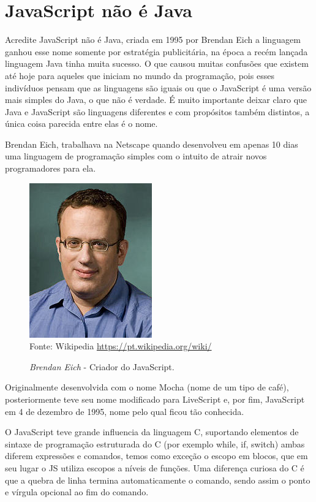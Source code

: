 \documentclass[
	12pt,				%
	openright,			%
	twoside,			%
	a4paper,			%
	english,			%
	brazil				%
	]{abntex2}
\begin{document}
\chapter{JavaScript não é Java}
Acredite JavaScript não é Java, criada em 1995 por Brendan Eich a linguagem ganhou esse nome somente por estratégia publicitária, na época a recém lançada linguagem Java tinha muita sucesso. O que causou muitas confusões que existem até hoje para aqueles que iniciam no mundo da programação, pois esses indivíduos pensam que as linguagens são iguais ou que o JavaScript é uma versão mais simples do Java, o que não é verdade. É muito importante deixar claro que Java e JavaScript são linguagens diferentes e com propósitos também distintos, a única coisa parecida entre elas é o nome.

Brendan Eich, trabalhava na Netscape quando desenvolveu em apenas 10 dias uma linguagem de programação simples com o intuito de atrair novos programadores para ela.

\begin{figure}[h]
    \centering
    \label{fig:BrendanEich}
    \caption{\textit{Brendan Eich} - Criador do JavaScript.}
    \includegraphics[scale=0.6]{brendan-eich} \\
    Fonte: {Wikipedia \url{https://pt.wikipedia.org/wiki/}}
\end{figure}

Originalmente desenvolvida com o nome Mocha (nome de um tipo de café), posteriormente teve seu nome modificado para LiveScript e, por fim, JavaScript em 4 de dezembro de 1995, nome pelo qual ficou tão conhecida.

O JavaScript teve grande influencia da linguagem C, suportando elementos de sintaxe de programação estruturada do C (por exemplo while, if, switch) ambas diferem expressões e comandos, temos como exceção o escopo em blocos, que em seu lugar o JS utiliza escopos a níveis de funções. Uma diferença curiosa do C é que a quebra de linha termina automaticamente o comando, sendo assim o ponto e vírgula opcional ao fim do comando.
\end{document}
